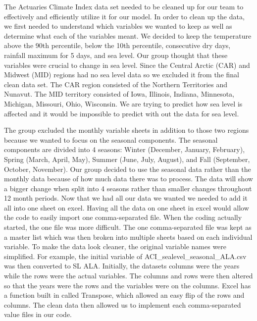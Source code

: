 \documentclass[12pt]{report}
\begin{document}
\indent	\par The Actuaries Climate Index data set needed to be cleaned up for our team to effectively and efficiently utilize it for our model. In order to clean up the data, we first needed to understand which variables we wanted to keep as well as determine what each of the variables meant. We decided to keep  the temperature above the 90th percentile, below the 10th percentile, consecutive dry days, rainfall maximum for 5 days, and sea level. Our group thought that these variables were crucial to change in sea level. Since the Central Arctic (CAR) and Midwest (MID) regions had no sea level data so we excluded it from the final clean data set. The CAR region consisted of the Northern Territories and Nunavut. The MID territory consisted of Iowa, Illinois, Indiana, Minnesota, Michigan, Missouri, Ohio, Wisconsin. We are trying to predict how sea level is affected and it would be impossible to predict with out the data for sea level. 
		\par The group excluded the monthly variable sheets in addition to those two regions because  we wanted to focus on the seasonal components. The seasonal components are divided into 4 seasons: Winter (December, January, February), Spring (March, April, May), Summer (June, July, August), and Fall (September, October, November). Our group decided to use the seasonal data rather than the monthly data because of how much data there was to process. The data will show a bigger change when split into 4 seasons rather than smaller changes throughout 12 month periods. Now that we had all our data we wanted we needed to add it all into one sheet on excel. Having all the data on one sheet in excel would allow the code to easily import one comma-separated file. When the coding actually started, the one file was more difficult. The one comma-separated file was kept as a master list which was then broken into multiple sheets based on each individual variable. To make the data look cleaner, the original variable names were simplified. For example, the initial variable of ACI\_sealevel\_seasonal\_ALA.csv  was then converted to SL ALA. Initially, the datasets columns were the years while the rows were the actual variables. The columns and rows were then altered so that the years were the rows and the variables were on the columns. Excel has a function built in called Transpose, which allowed an easy flip of the rows and columns. The clean data then allowed us to implement each comma-separated value files in our code.
\end{document}
